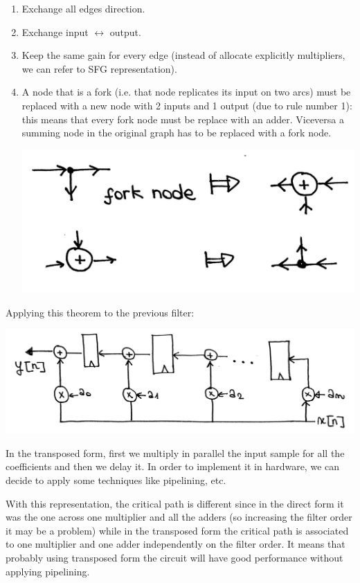 \begin{enumerate}
  \item Exchange all edges direction.
  \item Exchange input $\leftrightarrow$ output.
  \item Keep the same gain for every edge (instead of allocate explicitly multipliers, we can refer to SFG representation).
  \item A node that is a fork (i.e. that node replicates its input on two arcs) must be replaced with a new node with 2 inputs and 1 output (due to rule number 1): this means that every fork node must be replace with an adder. Viceversa a summing node in the original graph has to be replaced with a fork node.
  \begin{center}
    \includegraphics[width=0.7\linewidth]{img/img1/04}
  \end{center}

\end{enumerate}

Applying this theorem to the previous filter:
\begin{center}
  \includegraphics[width=0.7\linewidth]{img/img1/03}
\end{center}

In the transposed form, first we multiply in parallel the input sample for all the coefficients and then we delay it. In order to implement it in hardware, we can decide to apply some techniques like pipelining, etc.

With this representation, the critical path is different since in the direct form it was the one across one multiplier and all the adders (so increasing the filter order it may be a problem) while in the transposed form the critical path is associated to one multiplier and one adder independently on the filter order. It means that probably using transposed form the circuit will have good performance without applying pipelining. \\

